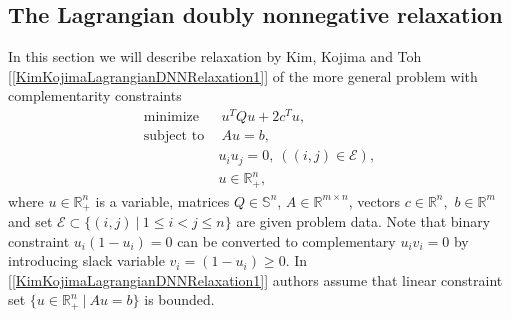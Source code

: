 \documentclass[12pt]{book}
\theoremstyle{definition}
\begin{document}
		\subsection{The Lagrangian doubly nonnegative relaxation}
\label{SectionLagrangianDNNrelax}
In this section we will describe relaxation by Kim, Kojima and Toh [\ref{KimKojimaLagrangianDNNRelaxation1}] of the more general problem with complementarity constraints
\begin{equation}
\label{BinaryQP2}
\begin{array}{ll}
\mbox{minimize}&\ \ u^TQu + 2c^Tu ,\\
\mbox{subject to}&\ \ Au = b,\\
				 & \ u_iu_j = 0, \ ((i,j)\in \mathcal{E}), \\
				 &\ u\in \mathbb{R}^n_+, 
\end{array}
\end{equation}
where $u\in\mathbb{R}^n_+$ is a variable, matrices $Q\in\mathbb{S}^n$, $A\in \mathbb{R}^{m\times n}$, vectors $c\in\mathbb{R}^n,$ $b\in\mathbb{R}^m$ and set $\mathcal{E}\subset \{(i,j)\ \vert \ 1\leq i< j\leq n\}$ are given problem data. Note that binary constraint $u_i(1-u_i) = 0$ can be converted to complementary $u_iv_i = 0$ by introducing slack variable $v_i = (1-u_i)\geq 0.$ In [\ref{KimKojimaLagrangianDNNRelaxation1}] authors assume that linear constraint set
$\{ u\in\mathbb{R}^n_+ \ \vert \ Au = b \}$ is bounded.
\end{document}
